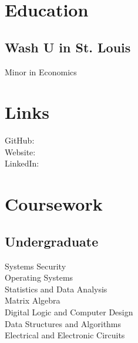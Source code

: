 \documentclass[]{deedy-resume-openfont}
\begin{document}
%
%

%
%



%
%

\begin{minipage}[t]{0.33\textwidth}


\section{Education}

\subsection{Wash U in St. Louis}
Minor in Economics \\
\sectionsep


\section{Links}
GitHub: \href{https://github.com/trentandraka}{} \\
Website:  \href{https://trentandraka.me}{} \\
LinkedIn:  \href{https://www.linkedin.com/in/trentandraka}{} \\
\sectionsep


\section{Coursework}
\subsection{Undergraduate}
Systems Security\\
Operating Systems\\
Statistics and Data Analysis\\
Matrix Algebra\\
Digital Logic and Computer Design\\
Data Structures and Algorithms\\
Electrical and Electronic Circuits\\
\sectionsep


\end{minipage}
\end{document}
